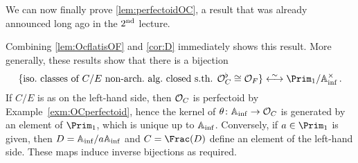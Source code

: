 We can now finally prove \cref{lem:perfectoidOC}, a result that was already announced long ago in the $2^{\text{nd}}$ lecture.
\begin{proof*}
	Combining \cref{lem:OcflatisOF} and \cref{cor:D} immediately shows this result. More generally, these results show that there is a bijection
	\begin{equation*}
		\{\text{iso.\ classes of }C/E\text{ non-arch.\ alg.\ closed s.th. }\Oo_C^\flat\cong \Oo_F\}\lrisomorphism \Prim_1/\IA_\inf^\times\,.
	\end{equation*}
	If $C/E$ is as on the left-hand side, then $\mathcal{O}_C$ is perfectoid by Example~\cref{exm:OCperfectoid}, hence the kernel of $\theta\colon \IA_\inf\morphism\Oo_C$ is generated by an element of $\Prim_1$, which is unique up to $\mathbb{A}_{\mathrm{inf}}$. Conversely, if $a\in \Prim_1$ is given, then $D=\mathbb{A}_{\mathrm{inf}}/a\mathbb{A}_{\mathrm{inf}}$ and $C=\Frac(D)$ define an element of the left-hand side. These maps induce inverse bijections as required.
\end{proof*}
